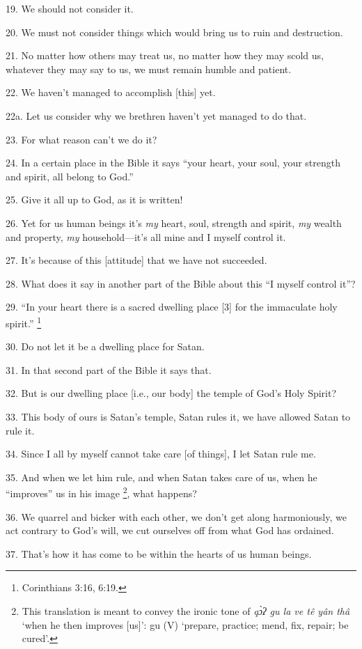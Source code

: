 19. We should not consider it.

20. We must not consider things which would bring us to ruin and destruction.

21. No matter how others may treat us, no matter how they may scold us, whatever
they may say to us, we must remain humble and patient.

22. We haven't managed to accomplish [this] yet.

22a. Let us consider why we brethren haven't yet managed to do that.

23. For what reason can't we do it?

24. In a certain place in the Bible it says ``your heart, your soul, your strength
and spirit, all belong to God.''

25. Give it all up to God, as it is written!

26. Yet for us human beings it's \textit{my} heart, soul, strength and spirit,
\textit{my} wealth and property, \textit{my }household---it's all mine and I myself
control it.

27. It's because of this [attitude] that we have not succeeded.

28. What does it say in another part of the Bible about this ``I myself control
it''?

29. ``In your heart there is a sacred dwelling place [3] for the immaculate holy
spirit.'' \footnote{Corinthians 3:16, 6:19.}

30. Do not let it be a dwelling place for Satan.

31. In that second part of the Bible it says that.

32. But is our dwelling place [i.e., our body] the temple of God's Holy Spirit?

33. This body of ours is Satan's temple, Satan rules it, we have allowed Satan
to rule it.

34. Since I all by myself cannot take care [of things], I let Satan rule me.

35. And when we let him rule, and when Satan takes care of us, when he ``improves''
us in his image \footnote{This translation is meant to convey the ironic tone of \textit{qɔ̀ʔ gu la ve tê yân thâ} `when he then improves [us]': gu (V) `prepare, practice; mend, fix, repair; be cured'.}, what happens?

36. We quarrel and bicker with each other, we don't get along harmoniously, we
act contrary to God's will, we cut ourselves off from what God has ordained.

37. That's how it has come to be within the hearts of us human beings.

